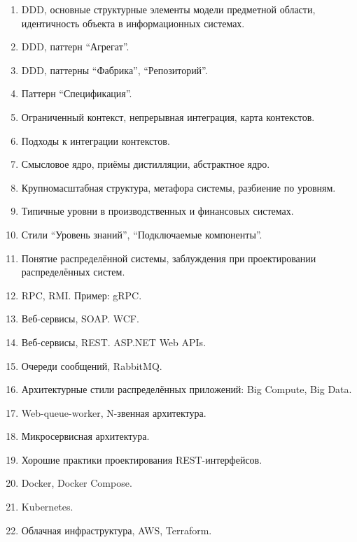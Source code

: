 \documentclass[a5paper]{article}
\begin{document}
\begin{enumerate}
    \item DDD, основные структурные элементы модели предметной области, идентичность объекта в информационных системах.
    \item DDD, паттерн \enquote{Агрегат}.
    \item DDD, паттерны \enquote{Фабрика}, \enquote{Репозиторий}.
    \item Паттерн \enquote{Спецификация}.
    \item Ограниченный контекст, непрерывная интеграция, карта контекстов.
    \item Подходы к интеграции контекстов.
    \item Смысловое ядро, приёмы дистилляции, абстрактное ядро.
    \item Крупномасштабная структура, метафора системы, разбиение по уровням. 
    \item Типичные уровни в производственных и финансовых системах.
    \item Стили \enquote{Уровень знаний}, \enquote{Подключаемые компоненты}.
    \item Понятие распределённой системы, заблуждения при проектировании распределённых систем.
    \item RPC, RMI. Пример: gRPC.
    \item Веб-сервисы, SOAP. WCF.
    \item Веб-сервисы, REST. ASP.NET Web APIs.
    \item Очереди сообщений, RabbitMQ. %
    \item Архитектурные стили распределённых приложений: Big Compute, Big Data.
    \item Web-queue-worker, N-звенная архитектура.
    \item Микросервисная архитектура.
    \item Хорошие практики проектирования REST-интерфейсов.
    \item Docker, Docker Compose.
    \item Kubernetes.
    \item Облачная инфраструктура, AWS, Terraform.
\end{enumerate}
\end{document}
